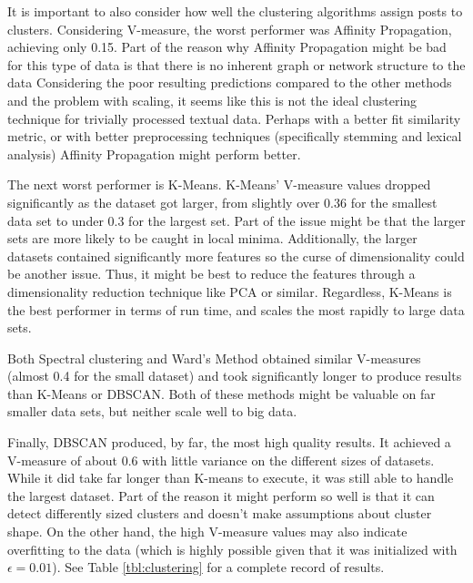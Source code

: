\documentclass[letterpaper,10pt]{article}
\begin{document}
It is important to also consider how well the clustering algorithms assign
posts to clusters. Considering V-measure, the worst performer was Affinity
Propagation, achieving only 0.15. Part of the reason why Affinity
Propagation might be bad for this type of data is that there is no inherent
graph or network structure to the data Considering the poor
resulting predictions compared to the other methods and the problem with
scaling, it seems like this is not the ideal clustering technique for
trivially processed textual data. Perhaps with a better fit similarity
metric, or with better preprocessing techniques (specifically stemming and
lexical analysis) Affinity Propagation might perform better.

The next worst performer is K-Means. K-Means' V-measure values dropped
significantly as the dataset got larger, from slightly over 0.36
for the smallest data set to under 0.3 for the largest set. Part of the
issue might be that the larger sets are more likely to be caught in local
minima. Additionally, the larger datasets contained significantly more
features so the curse of dimensionality could be another issue. Thus, it
might be best to reduce the features through a dimensionality reduction
technique like PCA or similar. Regardless, K-Means is the best performer
in terms of run time, and scales the most rapidly to large data sets.

Both Spectral clustering and Ward's Method obtained similar V-measures
(almost 0.4 for the small dataset) and took significantly longer to produce
results than K-Means or DBSCAN. Both of these methods might be valuable on
far smaller data sets, but neither scale well to big data.

Finally, DBSCAN produced, by far, the most high quality results. It
achieved a V-measure of about 0.6 with little variance on the different
sizes of datasets. While it did take far longer than K-means to execute, it
was still able to handle the largest dataset. Part of the reason it might
perform so well is that it can detect differently sized clusters and
doesn't make assumptions about cluster shape. On the other hand, the high
V-measure values may also indicate overfitting to the data (which is highly
possible given that it was initialized with $\epsilon=0.01$). See Table
\ref{tbl:clustering} for a complete record of results.
\end{document}
